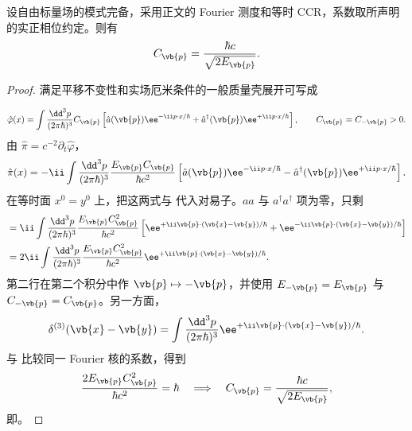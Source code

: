 \begin{proposition}[模式系数的正则归一化]
设自由标量场的模式完备，采用正文的 Fourier 测度和等时 CCR，系数取所声明的实正相位约定。则有
\begin{equation}
 C_{\vb{p}}=\frac{\hbar c}{\sqrt{2E_{\vb{p}}}}.
\label{eq:scalar-C-normalization-r16}
\end{equation}
\end{proposition}
\begin{proof}
满足平移不变性和实场厄米条件的一般质量壳展开可写成

\begin{equation*}
 \hat\varphi(x)=
 \int\frac{\dd^3 p}{(2\pi\hbar)^3}C_{\vb{p}}
 \left[
 \hat a(\vb{p})\ee^{-\ii p\cdot x/\hbar}
 +\hat a^\dagger(\vb{p})\ee^{+\ii p\cdot x/\hbar}
 \right],
 \qquad C_{\vb{p}}=C_{-\vb{p}}>0.
\end{equation*}
由 $\hat\pi=c^{-2}\partial_t\hat\varphi$，
\begin{equation*}
 \hat\pi(x)=
 -\ii\int\frac{\dd^3 p}{(2\pi\hbar)^3}
 \frac{E_{\vb{p}}C_{\vb{p}}}{\hbar c^2}
 \left[
 \hat a(\vb{p})\ee^{-\ii p\cdot x/\hbar}
 -\hat a^\dagger(\vb{p})\ee^{+\ii p\cdot x/\hbar}
 \right].
\end{equation*}
在等时面 $x^0=y^0$ 上，把这两式与  代入对易子。$aa$ 与 $a^\dagger a^\dagger$ 项为零，只剩
\begin{align*}
 [\hat\varphi(\vb{x},t),\hat\pi(\vb{y},t)]
 &=\ii\int\frac{\dd^3 p}{(2\pi\hbar)^3}
 \frac{E_{\vb{p}}C_{\vb{p}}^{2}}{\hbar c^2}
 \left[
 \ee^{+\ii\vb{p}\cdot(\vb{x}-\vb{y})/\hbar}
 +\ee^{-\ii\vb{p}\cdot(\vb{x}-\vb{y})/\hbar}
 \right]\\
 &=2\ii\int\frac{\dd^3 p}{(2\pi\hbar)^3}
 \frac{E_{\vb{p}}C_{\vb{p}}^{2}}{\hbar c^2}
 \ee^{+\ii\vb{p}\cdot(\vb{x}-\vb{y})/\hbar}.
\end{align*}
第二行在第二个积分中作 $\vb{p}\mapsto-\vb{p}$，并使用 $E_{-\vb{p}}=E_{\vb{p}}$ 与 $C_{-\vb{p}}=C_{\vb{p}}$。另一方面，
\begin{equation*}
 \delta^{(3)}(\vb{x}-\vb{y})
 =\int\frac{\dd^3 p}{(2\pi\hbar)^3}
 \ee^{+\ii\vb{p}\cdot(\vb{x}-\vb{y})/\hbar}.
\end{equation*}
与  比较同一 Fourier 核的系数，得到
\begin{equation*}
 \frac{2E_{\vb{p}}C_{\vb{p}}^{2}}{\hbar c^2}=\hbar
 \quad\Longrightarrow\quad
 C_{\vb{p}}=\frac{\hbar c}{\sqrt{2E_{\vb{p}}}},
\end{equation*}
即。
\end{proof}

